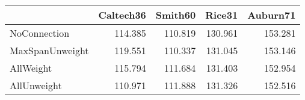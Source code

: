 \begin{tabular}{lrrrr}
\toprule
{} & Caltech36 & Smith60 &  Rice31 & Auburn71 \\
\midrule
NoConnection    &   114.385 & 110.819 & 130.961 &  153.281 \\
MaxSpanUnweight &   119.551 & 110.337 & 131.045 &  153.146 \\
AllWeight       &   115.794 & 111.684 & 131.403 &  152.954 \\
AllUnweight     &   110.971 & 111.888 & 131.326 &  152.516 \\
\bottomrule
\end{tabular}
